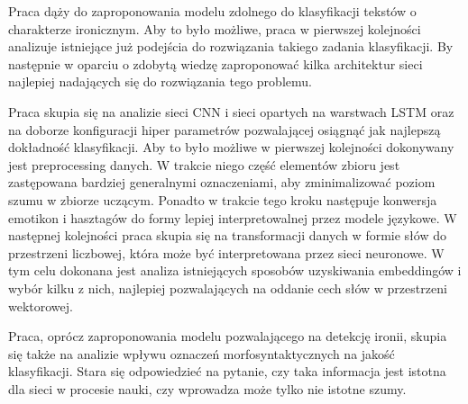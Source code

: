 
Praca dąży do zaproponowania modelu zdolnego do klasyfikacji tekstów o charakterze ironicznym. Aby to było możliwe, praca w pierwszej kolejności analizuje istniejące już podejścia do rozwiązania takiego zadania klasyfikacji. By następnie w oparciu o zdobytą wiedzę zaproponować kilka architektur sieci najlepiej nadających się do rozwiązania tego problemu. 

Praca skupia się na analizie sieci CNN i sieci opartych na warstwach LSTM oraz na doborze konfiguracji hiper parametrów pozwalającej osiągnąć jak najlepszą dokładność klasyfikacji. Aby to było możliwe w pierwszej kolejności dokonywany jest preprocessing danych. W trakcie niego część elementów zbioru jest zastępowana bardziej generalnymi oznaczeniami, aby zminimalizować poziom szumu w zbiorze uczącym. Ponadto w trakcie tego kroku następuje konwersja emotikon i hasztagów do formy lepiej interpretowalnej przez modele językowe. W następnej kolejności praca skupia się na transformacji danych w formie słów do przestrzeni liczbowej, która może być interpretowana przez sieci neuronowe. W tym celu dokonana jest analiza istniejących sposobów uzyskiwania embeddingów i wybór kilku z nich, najlepiej pozwalających na oddanie cech słów w przestrzeni wektorowej. 

Praca, oprócz zaproponowania modelu pozwalającego na detekcję ironii, skupia się także na analizie wpływu oznaczeń morfosyntaktycznych na jakość klasyfikacji. Stara się odpowiedzieć na pytanie, czy taka informacja jest istotna dla sieci w procesie nauki, czy wprowadza może tylko nie istotne szumy. 



